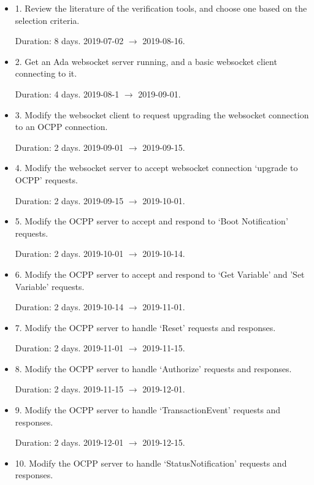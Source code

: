 \documentclass[11pt]{article}
\begin{document}
\begin{itemize}
	\item 1. Review the literature of the verification tools, and choose one based on the selection criteria.
	
	Duration: 8 days. 2019-07-02 $\rightarrow$ 2019-08-16.
	
	\item 2. Get an Ada websocket server running, and a basic websocket client connecting to it.
	
	Duration: 4 days. 2019-08-1 $\rightarrow$ 2019-09-01.
	
	\item 3. Modify the websocket client to request upgrading the websocket connection to an OCPP connection.
	
	Duration: 2 days. 2019-09-01 $\rightarrow$ 2019-09-15. 
	
	\item 4. Modify the websocket server to accept websocket connection `upgrade to OCPP' requests.
	
	Duration: 2 days. 2019-09-15 $\rightarrow$ 2019-10-01. 
	
	\item 5. Modify the OCPP server to accept and respond to `Boot Notification' requests.
	
	Duration: 2 days. 2019-10-01 $\rightarrow$ 2019-10-14.
	
	\item 6. Modify the OCPP server to accept and respond to `Get Variable' and 'Set Variable' requests.	
	
	Duration: 2 days. 2019-10-14 $\rightarrow$ 2019-11-01.
	
	\item 7. Modify the OCPP server to handle `Reset' requests and responses.	
	
	Duration: 2 days. 2019-11-01 $\rightarrow$ 2019-11-15.
	
	\item 8. Modify the OCPP server to handle `Authorize' requests and responses.
	
	Duration: 2 days. 2019-11-15 $\rightarrow$ 2019-12-01.
	
	\item 9. Modify the OCPP server to handle `TransactionEvent' requests and responses.	
	
	Duration: 2 days. 2019-12-01 $\rightarrow$ 2019-12-15.
	
	\item 10. Modify the OCPP server to handle `StatusNotification' requests and responses.	
	

\end{itemize}
\end{document}
